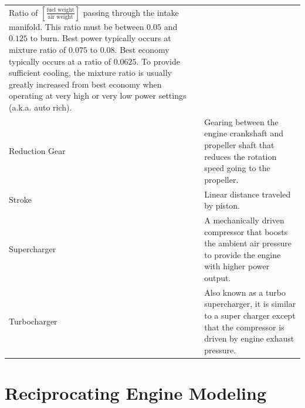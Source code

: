 \documentclass[
]{book}
\begin{document}
\begin{longtable}[]{@{}ll@{}}
\begin{minipage}[t]{0.73\columnwidth}
Ratio of \(\left[ \frac{\text{fuel weight}}{\text{air weight}} \right]\) passing through the intake manifold. This ratio must be between \(0.05\) and \(0.125\) to burn. Best power typically occurs at mixture ratio of \(0.075\) to \(0.08\). Best economy typically occurs at a ratio of \(0.0625\). To provide sufficient cooling, the mixture ratio is usually greatly increased from best economy when operating at very high or very low power settings (a.k.a. auto rich).\strut
\end{minipage}\tabularnewline
\begin{minipage}[t]{0.21\columnwidth}\raggedright
Reduction Gear\strut
\end{minipage} & \begin{minipage}[t]{0.73\columnwidth}\raggedright
Gearing between the engine crankshaft and propeller shaft that reduces the rotation speed going to the propeller.\strut
\end{minipage}\tabularnewline
\begin{minipage}[t]{0.21\columnwidth}\raggedright
Stroke\strut
\end{minipage} & \begin{minipage}[t]{0.73\columnwidth}\raggedright
Linear distance traveled by piston.\strut
\end{minipage}\tabularnewline
\begin{minipage}[t]{0.21\columnwidth}\raggedright
Supercharger\strut
\end{minipage} & \begin{minipage}[t]{0.73\columnwidth}\raggedright
A mechanically driven compressor that boosts the ambient air pressure to provide the engine with higher power output.\strut
\end{minipage}\tabularnewline
\begin{minipage}[t]{0.21\columnwidth}\raggedright
Turbocharger\strut
\end{minipage} & \begin{minipage}[t]{0.73\columnwidth}\raggedright
Also known as a turbo supercharger, it is similar to a super charger except that the compressor is driven by engine exhaust pressure.\strut
\end{minipage}\tabularnewline
\bottomrule
\end{longtable}

\hypertarget{reciprocating-engine-modeling}{%
\section{Reciprocating Engine Modeling}\label{reciprocating-engine-modeling}}
\end{document}
